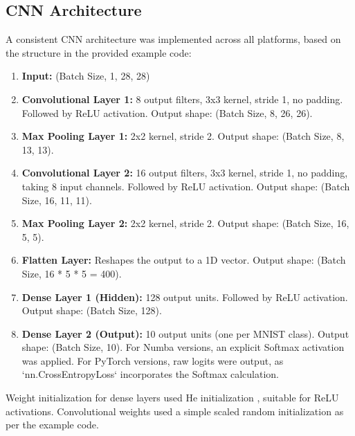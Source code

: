 \documentclass[conference]{IEEEtran} %
\begin{document}
\subsection{CNN Architecture}
A consistent CNN architecture was implemented across all platforms, based on the structure in the provided example code:
\begin{enumerate}
    \item \textbf{Input:} (Batch Size, 1, 28, 28)
    \item \textbf{Convolutional Layer 1:} 8 output filters, 3x3 kernel, stride 1, no padding. Followed by ReLU activation. Output shape: (Batch Size, 8, 26, 26).
    \item \textbf{Max Pooling Layer 1:} 2x2 kernel, stride 2. Output shape: (Batch Size, 8, 13, 13).
    \item \textbf{Convolutional Layer 2:} 16 output filters, 3x3 kernel, stride 1, no padding, taking 8 input channels. Followed by ReLU activation. Output shape: (Batch Size, 16, 11, 11).
    \item \textbf{Max Pooling Layer 2:} 2x2 kernel, stride 2. Output shape: (Batch Size, 16, 5, 5).
    \item \textbf{Flatten Layer:} Reshapes the output to a 1D vector. Output shape: (Batch Size, 16 * 5 * 5 = 400).
    \item \textbf{Dense Layer 1 (Hidden):} 128 output units. Followed by ReLU activation. Output shape: (Batch Size, 128).
    \item \textbf{Dense Layer 2 (Output):} 10 output units (one per MNIST class). Output shape: (Batch Size, 10). For Numba versions, an explicit Softmax activation was applied. For PyTorch versions, raw logits were output, as `nn.CrossEntropyLoss` incorporates the Softmax calculation.
\end{enumerate}
Weight initialization for dense layers used He initialization \cite{He2015}, suitable for ReLU activations. Convolutional weights used a simple scaled random initialization as per the example code.
\end{document}
